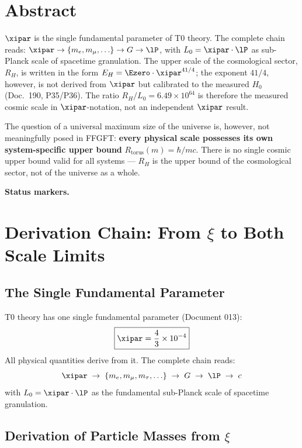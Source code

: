 \section*{Abstract}

$\xipar$ is the single fundamental parameter of T0 theory. The complete chain reads: $\xipar \to \{m_e, m_\mu, \ldots\} \to G \to \lP$, with $L_0 = \xipar \cdot \lP$ as sub-Planck scale of spacetime granulation. The upper scale of the cosmological sector, $R_H$, is written in the form $E_H = \Ezero \cdot \xipar^{41/4}$; the exponent $41/4$, however, is not derived from $\xipar$ but calibrated to the measured $H_0$ (Doc.~190, P35/P36). The ratio $R_H/L_0 = 6{.}49 \times 10^{64}$ is therefore the measured cosmic scale in $\xipar$-notation, not an independent $\xipar$ result.

The question of a universal maximum size of the universe is, however, not meaningfully posed in FFGFT: \textbf{every physical scale possesses its own system-specific upper bound} $R_\text{torus}(m) = \hbar/mc$. There is no single cosmic upper bound valid for all systems — $R_H$ is the upper bound of the cosmological sector, not of the universe as a whole.

\medskip\noindent\textbf{Status markers.}


\section{Derivation Chain: From \texorpdfstring{$\xi$}{xi} to Both Scale Limits}

\subsection{The Single Fundamental Parameter}

T0 theory has one single fundamental parameter (Document 013):
\begin{equation}
	\boxed{\xipar = \frac{4}{3} \times 10^{-4}}
\end{equation}
All physical quantities derive from it. The complete chain reads:
\begin{equation}
	\xipar \;\to\; \{m_e, m_\mu, m_\tau, \ldots\} \;\to\; G \;\to\; \lP \;\to\; c
\end{equation}
with $L_0 = \xipar \cdot \lP$ as the fundamental sub-Planck scale of spacetime granulation.

\subsection{Derivation of Particle Masses from \texorpdfstring{$\xi$}{xi}}

